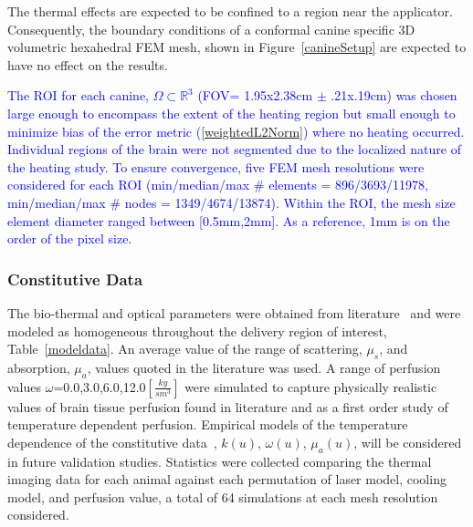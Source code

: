 \documentclass{article}
\newcommand{\eqn}[1]{(\ref{#1})}
\begin{document}
The thermal effects are expected to be confined to a region near
the applicator. Consequently, the boundary conditions of a
conformal canine specific 3D volumetric hexahedral FEM mesh, shown
in Figure~\ref{canineSetup} are expected to have no effect on the
results.  



\textcolor{blue}{ %
The ROI for each canine, $\Omega \subset \mathbb{R}^3$ (FOV=
1.95x2.38cm $\pm$ .21x.19cm) 
was chosen large enough to encompass the
extent of the heating region but small enough to minimize bias of
the error metric \eqn{weightedL2Norm} where no  heating occurred.
Individual regions of the brain were not segmented due to the
localized nature of the heating study.
To ensure convergence, five FEM mesh resolutions were considered for
each ROI (min/median/max \# elements = 896/3693/11978, 
          min/median/max \# nodes    = 1349/4674/13874).
Within the ROI, the mesh size element diameter ranged between
[0.5mm,2mm]. As a reference, 1mm is on the order of the pixel size.
}


\subsubsection{Constitutive Data}

The bio-thermal and optical parameters were obtained from
literature~\cite{Handbook05,Welch95,duck1990} and were modeled as
homogeneous throughout the delivery region of interest,
Table~\ref{modeldata}.  An average value of the range of
scattering, $\mu_s$, and absorption, $\mu_a$, values quoted in the
literature was used.  A range of perfusion values
$\omega$=0.0,3.0,6.0,12.0$[\frac{kg}{s m^3}]$ were simulated to
capture physically realistic values of brain tissue perfusion found
in literature and as a first order study of temperature dependent
perfusion.  Empirical models of the temperature dependence of the
constitutive data~\cite{pegau1997absorption,Duggan00,Handbook05},
$k(u)$, $\omega(u)$, $\mu_a(u)$, will be considered in future
validation studies.  Statistics were collected comparing the
thermal imaging data for each animal against each permutation of
laser model, cooling model, and perfusion value, a total of 64
simulations at each mesh resolution considered. 
\end{document}
